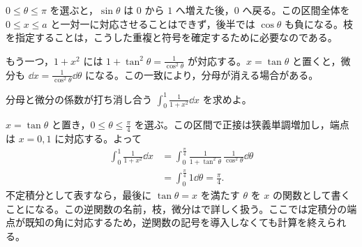 $0\le\theta\le\pi$ を選ぶと，$\sin\theta$ は $0$ から $1$ へ増えた後，$0$ へ戻る。この区間全体を $0\le x\le a$ と一対一に対応させることはできず，後半では $\cos\theta$ も負になる。枝を指定することは，こうした重複と符号を確定するために必要なのである。

もう一つ，$1+x^2$ には $1+\tan^2\theta=\frac1{\cos^2\theta}$ が対応する。$x=\tan\theta$ と置くと，微分も $\dd x=\frac1{\cos^2\theta}\dd\theta$ になる。この一致により，分母が消える場合がある。

\begin{example}{分母と微分の係数が打ち消し合う}
$\int_0^1\frac1{1+x^2}\dd x$ を求めよ。
\end{example}

$x=\tan\theta$ と置き，$0\le\theta\le\frac\pi4$ を選ぶ。この区間で正接は狭義単調増加し，端点は $x=0,1$ に対応する。よって
\[
\begin{aligned}
 \int_0^1\frac1{1+x^2}\dd x
 &=\int_0^{\frac\pi4}
   \frac1{1+\tan^2\theta}\,
   \frac1{\cos^2\theta}\dd\theta\\
 &=\int_0^{\frac\pi4}1\dd\theta
 =\frac\pi4.
\end{aligned}
\]
不定積分として表すなら，最後に $\tan\theta=x$ を満たす $\theta$ を $x$ の関数として書くことになる。この逆関数の名前，枝，微分はで詳しく扱う。ここでは定積分の端点が既知の角に対応するため，逆関数の記号を導入しなくても計算を終えられる。

